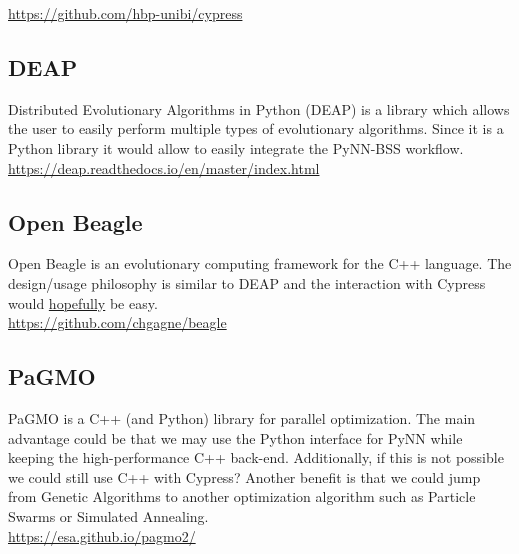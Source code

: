 \documentclass[11pt,a4paper]{article}
\begin{document}
\url{https://github.com/hbp-unibi/cypress}

\subsection{DEAP}

Distributed Evolutionary Algorithms in Python (DEAP) is a library which allows the user to easily perform multiple types of evolutionary algorithms. 
Since it is a Python library it would allow to easily integrate the PyNN-BSS workflow.\\ 

\url{https://deap.readthedocs.io/en/master/index.html}

\subsection{Open Beagle}
Open Beagle is an evolutionary computing framework for the C++ language. 
The design/usage philosophy is similar to DEAP and the interaction with Cypress would \underline{hopefully} be easy.\\

\url{https://github.com/chgagne/beagle}


\subsection{PaGMO}
PaGMO is a C++ (and Python) library for parallel optimization. 
The main advantage could be that we may use the Python interface for PyNN while keeping the high-performance C++ back-end.
Additionally, if this is not possible we could still use C++ with Cypress?
Another benefit is that we could jump from Genetic Algorithms to another optimization algorithm such as Particle Swarms or Simulated Annealing.\\

\url{https://esa.github.io/pagmo2/}
\end{document}
